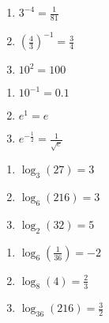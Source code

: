 \begin{multicols}{3}
\begin{enumerate}
\setcounter{enumi}{\value{HW}}


\item  $3^{-4} = \frac{1}{81}$

\item  $\left(\frac{4}{3} \right)^{-1} = \frac{3}{4}$

\item  $10^{2} = 100$

\setcounter{HW}{\value{enumi}}
\end{enumerate}
\end{multicols}

\begin{multicols}{3}
\begin{enumerate}
\setcounter{enumi}{\value{HW}}


\item  $10^{-1} = 0.1$

\item  $e^{1} = e$

\item  $e^{-\frac{1}{2}} = \frac{1}{\sqrt{e}}$

\setcounter{HW}{\value{enumi}}
\end{enumerate}
\end{multicols}

\begin{multicols}{3}
\begin{enumerate}
\setcounter{enumi}{\value{HW}}

\item $\log_{3} (27) = 3$
\item $\log_{6} (216) = 3$
\item $\log_{2} (32) = 5$

\setcounter{HW}{\value{enumi}}
\end{enumerate}
\end{multicols}

\begin{multicols}{3}
\begin{enumerate}
\setcounter{enumi}{\value{HW}}


\item  $\log_{6} \left( \frac{1}{36} \right) = -2$
\item $\log_{8} (4) = \frac{2}{3}$
\item $\log_{36} (216) = \frac{3}{2}$

\setcounter{HW}{\value{enumi}}
\end{enumerate}
\end{multicols}

